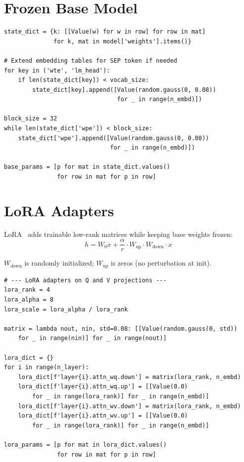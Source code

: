 \documentclass[11pt,a4paper]{article}
\begin{document}
\section{Frozen Base Model}

\begin{lstlisting}[firstnumber=95]
state_dict = {k: [[Value(w) for w in row] for row in mat]
              for k, mat in model['weights'].items()}

# Extend embedding tables for SEP token if needed
for key in ('wte', 'lm_head'):
    if len(state_dict[key]) < vocab_size:
        state_dict[key].append([Value(random.gauss(0, 0.08))
                                for _ in range(n_embd)])

block_size = 32
while len(state_dict['wpe']) < block_size:
    state_dict['wpe'].append([Value(random.gauss(0, 0.08))
                              for _ in range(n_embd)])

base_params = [p for mat in state_dict.values()
               for row in mat for p in row]
\end{lstlisting}

\section{LoRA Adapters}

LoRA~\cite{hu2021lora} adds trainable low-rank matrices while keeping base weights frozen:
\[
h = W_0 x + \frac{\alpha}{r} \cdot W_{\text{up}} \cdot W_{\text{down}} \cdot x
\]

$W_{\text{down}}$ is randomly initialized; $W_{\text{up}}$ is zeros (no perturbation at init).

\begin{lstlisting}[firstnumber=110]
# --- LoRA adapters on Q and V projections ---
lora_rank = 4
lora_alpha = 8
lora_scale = lora_alpha / lora_rank

matrix = lambda nout, nin, std=0.08: [[Value(random.gauss(0, std))
    for _ in range(nin)] for _ in range(nout)]

lora_dict = {}
for i in range(n_layer):
    lora_dict[f'layer{i}.attn_wq.down'] = matrix(lora_rank, n_embd)
    lora_dict[f'layer{i}.attn_wq.up'] = [[Value(0.0)
        for _ in range(lora_rank)] for _ in range(n_embd)]
    lora_dict[f'layer{i}.attn_wv.down'] = matrix(lora_rank, n_embd)
    lora_dict[f'layer{i}.attn_wv.up'] = [[Value(0.0)
        for _ in range(lora_rank)] for _ in range(n_embd)]

lora_params = [p for mat in lora_dict.values()
               for row in mat for p in row]
\end{lstlisting}
\end{document}
